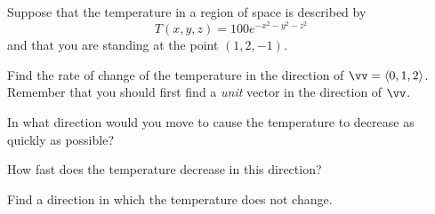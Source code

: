 \begin{activity} \label{A:10.6.14} 
  Suppose that the temperature in a region of space is described by
  $$
  T(x,y,z) = 100e^{-x^2-y^2-z^2}
  $$
  and that you are standing at the point $(1,2,-1)$.
  \ba
\item Find the rate of change of the temperature in the direction of
  $\vv=\langle 0, 1, 2\rangle$.  Remember that you should first find a
  {\em unit} vector in the direction of $\vv$.

\item In what direction would you move to cause the temperature to
  decrease as quickly as possible?

\item How fast does the temperature decrease in this direction?

\item Find a direction in which the temperature does
  not change.

  \ea

\end{activity}
\aftera
